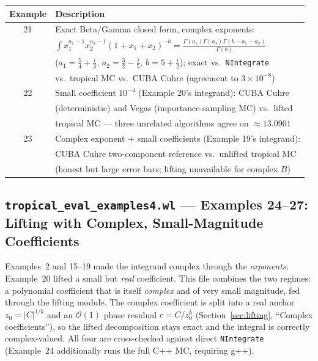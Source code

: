 \documentclass[11pt,a4paper]{article}
\begin{document}
\begin{center}
\begin{tabular}{cl}
\toprule
\textbf{Example} & \textbf{Description} \\
\midrule
21 & Exact Beta/Gamma closed form, complex exponents: \\
   & $\int x_1^{a_1-1} x_2^{a_2-1} (1{+}x_1{+}x_2)^{-b} = \frac{\Gamma(a_1)\Gamma(a_2)\Gamma(b-a_1-a_2)}{\Gamma(b)}$ \\
   & ($a_1 = \tfrac54 + \tfrac{i}{3}$, $a_2 = \tfrac32 - \tfrac{i}{5}$, $b = 5 + \tfrac{i}{2}$); exact vs.\ \texttt{NIntegrate} \\
   & vs.\ tropical MC vs.\ CUBA Cuhre (agreement to $3{\times}10^{-8}$) \\
22 & Small coefficient $10^{-4}$ (Example 20's integrand): CUBA Cuhre \\
   & (deterministic) and Vegas (importance-sampling MC) vs.\ lifted \\
   & tropical MC --- three unrelated algorithms agree on $\approx 13.0901$ \\
23 & Complex exponent + small coefficients (Example 19's integrand): \\
   & CUBA Cuhre two-component reference vs.\ unlifted tropical MC \\
   & (honest but large error bars; lifting unavailable for complex $B$) \\
\bottomrule
\end{tabular}
\end{center}

\subsection*{\texttt{tropical\_eval\_examples4.wl} --- Examples 24--27: Lifting with Complex, Small-Magnitude Coefficients}\label{sec:complex-coeff-examples}

Examples~2 and 15--19 made the integrand complex through the \emph{exponents}; Example~20 lifted a small but \emph{real} coefficient. This file combines the two regimes: a polynomial coefficient that is itself \emph{complex} and of very small magnitude, fed through the lifting module. The complex coefficient is split into a real anchor $z_0 = |C|^{1/k}$ and an $\mathcal{O}(1)$ phase residual $c = C/z_0^k$ (Section~\ref{sec:lifting}, ``Complex coefficients''), so the lifted decomposition stays exact and the integral is correctly complex-valued. All four are cross-checked against direct \texttt{NIntegrate} (Example~24 additionally runs the full C++ MC, requiring g++).
\end{document}
